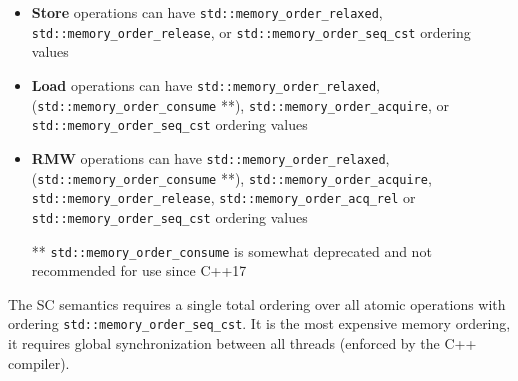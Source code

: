 \begin{itemize}
	\item \textbf{Store} operations can have \lstinline|std::memory_order_relaxed|, \lstinline|std::memory_order_release|, or
	      \lstinline|std::memory_order_seq_cst| ordering values
	\item \textbf{Load} operations can have \lstinline|std::memory_order_relaxed|, (\lstinline|std::memory_order_consume| **),
	      \lstinline|std::memory_order_acquire|, or \lstinline|std::memory_order_seq_cst| ordering values
	\item \textbf{RMW} operations can have \lstinline|std::memory_order_relaxed|, (\lstinline|std::memory_order_consume| **),
	      \lstinline|std::memory_order_acquire|, \lstinline|std::memory_order_release|, \lstinline|std::memory_order_acq_rel| or
	      \lstinline|std::memory_order_seq_cst| ordering values
   \item[**] \lstinline|std::memory_order_consume| is somewhat deprecated and not recommended for use since C++17
\end{itemize}

The SC semantics requires a single total ordering over all atomic operations with ordering \lstinline|std::memory_order_seq_cst|. It is the most expensive memory ordering, it requires global synchronization between all threads (enforced by the C++ compiler).


